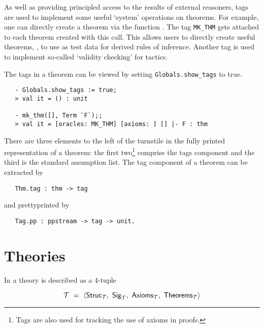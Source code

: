 As well as providing principled access to the results of external
reasoners, tags are used to implement some useful `system' operations
on theorems. For example, one can directly create a theorem via the
function . The tag \verb+MK_THM+ gets attached to each
theorem created with this call. This allows users to directly create
useful theorems, \eg, to use as test data for derived rules of
inference.  Another tag is used to implement so-called `validity
checking' for tactics.

The tags in a theorem can be viewed by setting \verb+Globals.show_tags+ to
true.

\setcounter{sessioncount}{0}
\begin{session}
\begin{verbatim}
   - Globals.show_tags := true;
   > val it = () : unit

   - mk_thm([], Term `F`);;
   > val it = [oracles: MK_THM] [axioms: ] [] |- F : thm
\end{verbatim}
\end{session}

There are three elements to the left of the turnstile in the fully printed
representation of a theorem: the first two\footnote{Tags are also used for
tracking the use of axioms in proofs.} comprise the tags component and the
third is the standard assumption list. The tag component of a theorem
can be extracted by

\begin{holboxed}
\begin{verbatim}
   Thm.tag : thm -> tag
\end{verbatim}
\end{holboxed}

\noindent and prettyprinted by

\begin{holboxed}
\begin{verbatim}
   Tag.pp : ppstream -> tag -> unit.
\end{verbatim}
\end{holboxed}


\section{Theories}
\label{theoryfns}

%
In \LOGIC{} a theory is described as a $4$-tuple

\[ {\cal T}\ =\ \langle{\sf Struc}_{\cal T},\
                {\sf Sig}_{\cal T},\
                {\sf Axioms}_{\cal T},\
                {\sf Theorems}_{\cal T}\rangle \]

